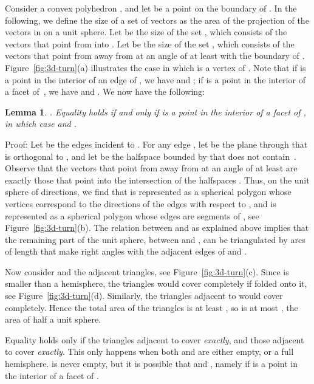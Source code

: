 \documentclass[11pt,a4paper]{article}
\newtheorem{lemma}{Lemma}
\newenvironment{proof}{Proof:}{\qed}
\def\squareforqed{\hbox{\rlap{}}}
\def\qed{\ifmmode\squareforqed\else{\unskip\nobreak\hfil
\penalty50\hskip1em\null\nobreak\hfil\squareforqed
\parfillskip=0pt\finalhyphendemerits=0\endgraf}\fi}
\begin{document}
Consider a convex polyhedron , and let  be a point on the boundary of . In the following, we define the size of a set of vectors  as the area of the projection of the vectors in  on a unit sphere. Let  be the size of the set , which consists of the vectors that point from  into . Let  be the size of the set , which consists of the vectors that point from  away from  at an angle of at least  with the boundary of . Figure~\ref{fig:3d-turn}(a) illustrates the case in which  is a vertex of . Note that if  is a point in the interior of an edge of , we have  and ; if  is a point in the interior of a facet of~, we have  and . We now have the following:
\begin{lemma}\label{le:angleplusturn}
. Equality holds if and only if  is a point in the interior of a facet of , in which case  and .
\end{lemma}
\begin{proof}
Let  be the edges incident to . For any edge , let  be the plane through  that is orthogonal to , and let  be the halfspace bounded by  that does not contain~. Observe that the vectors that point from  away from  at an angle of at least  are exactly those that point into the intersection of the halfspaces . Thus, on the unit sphere of directions, we find that  is represented as a spherical polygon whose vertices correspond to the directions of the edges  with respect to , and  is represented as a spherical polygon whose edges are segments of , see Figure~\ref{fig:3d-turn}(b). The relation between  and  as explained above implies that the remaining part of the unit sphere, between  and , can be triangulated by arcs of length  that make right angles with the adjacent edges of  and .

Now consider  and the adjacent triangles, see Figure~\ref{fig:3d-turn}(c). Since  is smaller than a hemisphere, the triangles would cover  completely if folded onto it, see Figure~\ref{fig:3d-turn}(d). Similarly, the triangles adjacent to  would cover  completely. Hence the total area of the triangles is at least , so  is at most , the area of half a unit sphere.

Equality holds only if the triangles adjacent to  cover  \emph{exactly}, and those adjacent to  cover  \emph{exactly}. This only happens when both  and  are either empty, or a full hemisphere.  is never empty, but it is possible that  and , namely if  is a point in the interior of a facet of .
\end{proof}
\end{document}
